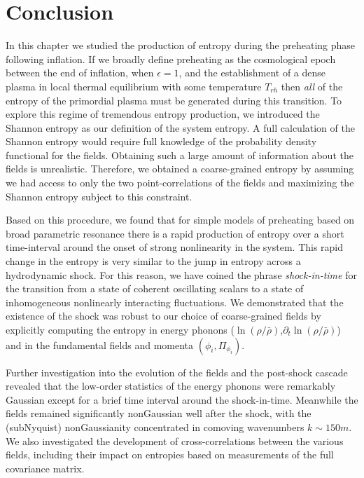 \documentclass[11pt,a4paper]{article}
\def\lnr{\ln(\rho/\bar{\rho})}
\def\dlnr{\partial_t\ln(\rho/\bar{\rho})}
\begin{document}
\section{Conclusion}
In this chapter we studied the production of entropy during the preheating phase following inflation.
If we broadly define preheating as the cosmological epoch between the end of inflation, when $\epsilon = 1$, and the establishment of a dense plasma in local thermal equilibrium with some temperature $T_{rh}$ then \emph{all} of the entropy of the primordial plasma must be generated during this transition.
To explore this regime of tremendous entropy production, we introduced the Shannon entropy as our definition of the system entropy.
A full calculation of the Shannon entropy would require full knowledge of the probability density functional for the fields.
Obtaining such a large amount of information about the fields is unrealistic.
Therefore, we obtained a coarse-grained entropy by assuming we had access to only the two point-correlations of the fields and maximizing the Shannon entropy subject to this constraint.

Based on this procedure, we found that for simple models of preheating based on broad parametric resonance there is a rapid production of entropy over a short time-interval around the onset of strong nonlinearity in the system.
This rapid change in the entropy is very similar to the jump in entropy across a hydrodynamic shock.
For this reason, we have coined the phrase \emph{shock-in-time} for the transition from a state of coherent oscillating scalars to a state of inhomogeneous nonlinearly interacting fluctuations.
We demonstrated that the existence of the shock was robust to our choice of coarse-grained fields by explicitly computing the entropy in energy phonons ($\lnr$,$\dlnr$) and in the fundamental fields and momenta $(\phi_i,\Pi_{\phi_i})$.

Further investigation into the evolution of the fields and the post-shock cascade revealed that the low-order statistics of the energy phonons were remarkably Gaussian except for a brief time interval around the shock-in-time.
Meanwhile the fields remained significantly nonGaussian well after the shock,
with the (subNyquist) nonGaussianity concentrated in comoving wavenumbers $k \sim 150m$.
We also investigated the development of cross-correlations between the various fields, including their impact on entropies based on measurements of the full covariance matrix.
\end{document}
